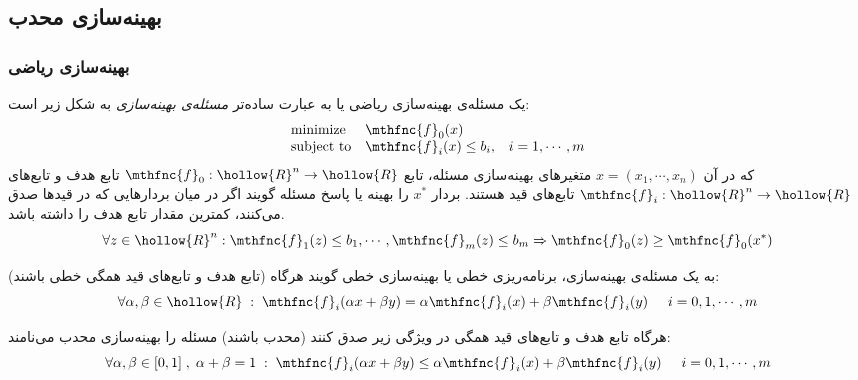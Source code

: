
\subsection{
بهینه‌سازی محدب
\cite{convexoptimization}
}


\subsubsection{
بهینه‌سازی ریاضی
}

یک مسئله‌ی بهینه‌سازی ریاضی یا به عبارت ساده‌تر
\emph{
مسئله‌ی بهینه‌سازی
}
به شکل زیر است:
\[
\begin{array}{lll}
\mbox{minimize} & \mthfnc{f}_0(x) & \\
\mbox{subject to} & \mthfnc{f}_i(x) \leq b_i, & i = 1, \cdots, m
\end{array}
\]
که در آن
$x = (x_1, \cdots, x_n)$
متغیرهای بهینه‌سازی مسئله، تابع
$\mthfnc{f}_0: \hollow{R}^n \rightarrow \hollow{R}$
تابع هدف
و تابع‌های
$\mthfnc{f}_i: \hollow{R}^n \rightarrow \hollow{R}$
تابع‌های قید
هستند. بردار
$x^*$
را بهینه
یا پاسخ مسئله گویند اگر در میان بردارهایی که در قید‌ها صدق می‌کنند، کمترین مقدار تابع هدف را داشته باشد.
\[
\forall z \in \hollow{R}^n: \mthfnc{f}_1(z) \leq b_1 , \cdots, \mthfnc{f}_m(z) \leq b_m \Rightarrow \mthfnc{f}_0(z) \geq \mthfnc{f}_0(x^*)
\]

به یک مسئله‌ی بهینه‌سازی، برنامه‌ریزی خطی
یا بهینه‌سازی خطی
گویند هرگاه (تابع هدف و تابع‌های قید همگی خطی باشند):
\[
\forall \alpha,\beta \in \hollow{R} \; : \; \mthfnc{f}_i( \alpha x + \beta y ) = \alpha \mthfnc{f}_i(x) + \beta \mthfnc{f}_i(y) \hspace{5mm} i = 0,1,\cdots,m
\]

هرگاه تابع هدف و تابع‌های قید همگی در ویژگی زیر صدق کنند (محدب
باشند) مسئله را بهینه‌سازی محدب
می‌نامند:
\[
\forall \alpha,\beta \in [0,1] \; , \; \alpha + \beta = 1 \; : \; \mthfnc{f}_i( \alpha x + \beta y ) \leq \alpha \mthfnc{f}_i(x) + \beta \mthfnc{f}_i(y) \hspace{5mm} i = 0,1,\cdots,m
\]


